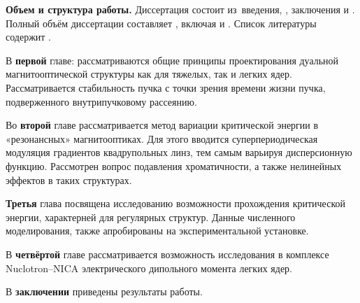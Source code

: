 \textbf{Объем и структура работы.} Диссертация состоит из~введения,
,
заключения и
.
%
Полный объём диссертации составляет
, включая
 и
.
Список литературы содержит
.

В \textbf{первой} главе: рассматриваются общие принципы проектирования дуальной магнитооптической структуры как для тяжелых, так и легких ядер. Рассматривается стабильность пучка с точки зрения времени жизни пучка, подверженного внутрипучковому рассеянию.

Во \textbf{второй} главе рассматривается метод вариации критической энергии в «резонансных» магнитооптиках. Для этого вводится суперпериодическая модуляция градиентов квадрупольных линз, тем самым варьируя дисперсионную функцию. Рассмотрен вопрос подавления хроматичности, а также нелинейных эффектов в таких структурах.

\textbf{Третья} глава посвящена исследованию возможности прохождения критической энергии, характерней для регулярных структур. Данные численного моделирования, также апробированы на экспериментальной установке.  

В \textbf{четвёртой} главе рассматривается возможность исследования в комплексе Nuclotron–NICA электрического дипольного момента легких ядер.

В \textbf{заключении} приведены результаты работы.